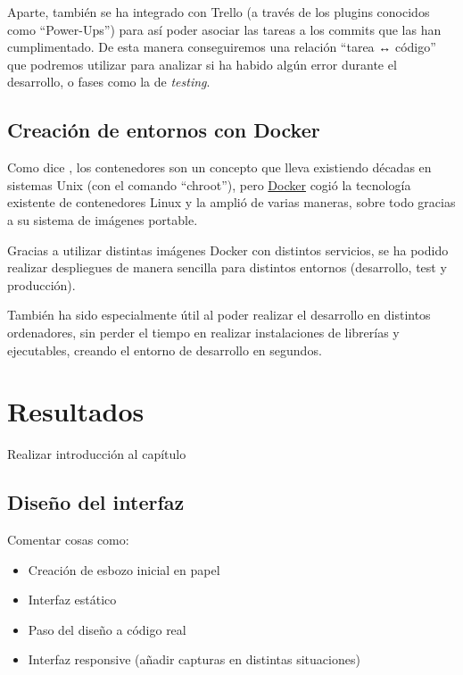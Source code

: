 \documentclass{\ClassPath/viu-tfm-template}
\begin{document}
Aparte, también se ha integrado con Trello (a través de los plugins conocidos como “Power-Ups”) para así poder asociar las tareas a los commits que las han cumplimentado. De esta manera conseguiremos una relación “tarea ↔ código” que podremos utilizar para analizar si ha habido algún error durante el desarrollo, o fases como la de \textit{testing}.


\section{Creación de entornos con Docker}
Como dice \textcite{mouat}, los contenedores son un concepto que lleva existiendo décadas en sistemas Unix (con el comando “chroot”), pero \href{https://es.wikipedia.org/wiki/Docker_(software)}{Docker} cogió la tecnología existente de contenedores Linux y la amplió de varias maneras, sobre todo gracias a su sistema de imágenes portable.

Gracias a utilizar distintas imágenes Docker con distintos servicios, se ha podido realizar despliegues de manera sencilla para distintos entornos (desarrollo, test y producción).

También ha sido especialmente útil al poder realizar el desarrollo en distintos ordenadores, sin perder el tiempo en realizar instalaciones de librerías y ejecutables, creando el entorno de desarrollo en segundos.





\chapter{Resultados}

{\color{red} Realizar introducción al capítulo}

\section{Diseño del interfaz}
{\color{red} Comentar cosas como:

    \begin{itemize}
        \item Creación de esbozo inicial en papel
        \item Interfaz estático
        \item Paso del diseño a código real
        \item Interfaz responsive (añadir capturas en distintas situaciones)
    \end{itemize}
}
\end{document}
